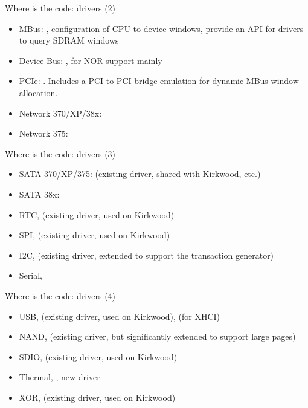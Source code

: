 \begin{frame}{Where is the code: drivers (2)}

\begin{itemize}
\item MBus: , configuration of CPU to
  device windows, provide an API for drivers to query SDRAM windows
\item Device Bus: , for NOR
  support mainly
\item PCIe: . Includes a PCI-to-PCI
  bridge emulation for dynamic MBus window allocation.
\item Network 370/XP/38x: 
\item Network 375: 
\end{itemize}

\end{frame}

\begin{frame}{Where is the code: drivers (3)}

\begin{itemize}
\item SATA 370/XP/375:  (existing driver,
  shared with Kirkwood, etc.)
\item SATA 38x: 
\item RTC,  (existing driver, used on Kirkwood)
\item SPI,  (existing driver, used on Kirkwood)
\item I2C,  (existing driver,
  extended to support the transaction generator)
\item Serial, 
\end{itemize}

\end{frame}

\begin{frame}{Where is the code: drivers (4)}

\begin{itemize}
\item USB,  (existing driver, used
  on Kirkwood),  (for XHCI)
\item NAND,  (existing driver,
  but significantly extended to support large pages)
\item SDIO,  (existing driver, used on
  Kirkwood)
\item Thermal, , new driver
\item XOR,  (existing driver, used on
  Kirkwood)
\end{itemize}

\end{frame}

